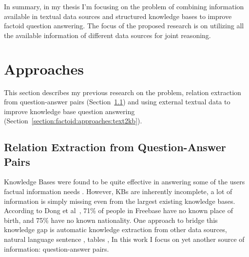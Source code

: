 In summary, in my thesis I'm focusing on the problem of combining information available in textual data sources and structured knowledge bases to improve factoid question answering.
The focus of the proposed research is on utilizing all the available information of different data sources for joint reasoning.

\section{Approaches}
\label{section:factoid:approaches}

This section describes my previous research on the problem, \ie relation extraction from question-answer pairs (Section~\ref{section:factoid:approaches:cqarelextract}) and using external textual data to improve knowledge base question answering (Section~\ref{section:factoid:approaches:text2kb}).


\subsection{Relation Extraction from Question-Answer Pairs}
\label{section:factoid:approaches:cqarelextract}

Knowledge Bases were found to be quite effective in answering some of the users factual information needs \cite{unger2014introduction}.
However, KBs are inherently incomplete, \ie a lot of information is simply missing even from the largest existing knowledge bases.
According to Dong et al~\cite{Dong:2014:KVW:2623330.2623623}, 71\% of people in
Freebase have no known place of birth, and 75\% have no known nationality.
One approach to bridge this knowledge gap is automatic knowledge extraction from other data sources, \eg natural language sentence \cite{Agichtein:2000:SER:336597.336644,Gupta:2014:BOS:2732286.2732288,jijkoun2004information,MintzBSJ09}, tables \cite{Cafarella:2008:WEP:1453856.1453916}, \etc
In this work I focus on yet another source of information: question-answer pairs.

